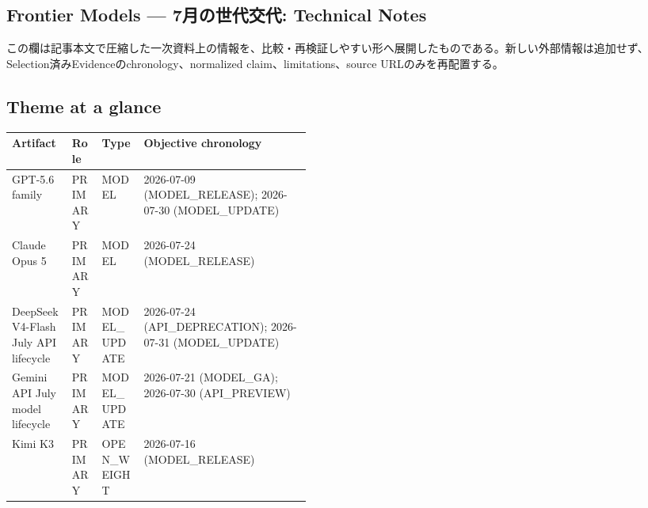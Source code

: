 \clearpage
{}
\subsection*{Frontier Models — 7月の世代交代: Technical Notes}
この欄は記事本文で圧縮した一次資料上の情報を、比較・再検証しやすい形へ展開したものである。新しい外部情報は追加せず、Selection済みEvidenceのchronology、normalized claim、limitations、source URLのみを再配置する。
\medskip
\subsection*{Theme at a glance}
\begin{center}
\footnotesize
\begin{tabularx}{\linewidth}{@{}p{0.20\linewidth}p{0.10\linewidth}p{0.14\linewidth}X@{}}
\toprule
Artifact & Role & Type & Objective chronology \\
\midrule
GPT-5.6 family & PRIMARY & MODEL & 2026-07-09 (MODEL\_RELEASE); 2026-07-30 (MODEL\_UPDATE) \\
Claude Opus 5 & PRIMARY & MODEL & 2026-07-24 (MODEL\_RELEASE) \\
DeepSeek V4-Flash July API lifecycle & PRIMARY & MODEL\_UPDATE & 2026-07-24 (API\_DEPRECATION); 2026-07-31 (MODEL\_UPDATE) \\
Gemini API July model lifecycle & PRIMARY & MODEL\_UPDATE & 2026-07-21 (MODEL\_GA); 2026-07-30 (API\_PREVIEW) \\
Kimi K3 & PRIMARY & OPEN\_WEIGHT & 2026-07-16 (MODEL\_RELEASE) \\
\bottomrule
\end{tabularx}
\end{center}
\normalsize

